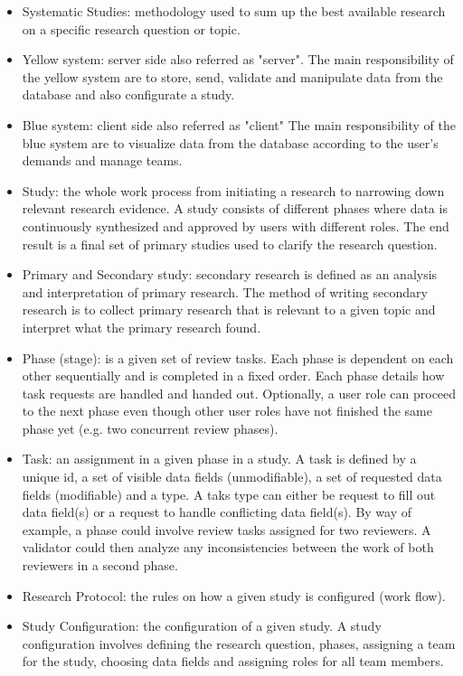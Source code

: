 	\begin{itemize}
	  \item Systematic Studies: methodology used to sum up the best available research on a specific research question or topic.  
	  \item Yellow system: server side also referred as "server". The main responsibility of the yellow system are to store, send, validate and manipulate data from the database and also configurate a study.
	  \item Blue system: client side also referred as "client" The main responsibility of the blue system are to visualize data from the database according to the user's demands and manage teams.
	  \item Study: the whole work process from initiating a research to narrowing down relevant research evidence. A study consists of different phases where data is continuously synthesized and approved by users with different roles. The end result is a final set of primary studies used to clarify the research question. 
	  \item Primary and Secondary study: secondary research is defined as an analysis and interpretation of primary research. The method of writing secondary research is to collect primary research that is relevant to a given topic and interpret what the primary research found.
	  \item Phase (stage): is a given set of review tasks. Each phase is dependent on each other sequentially and is completed in a fixed order. Each phase details how task requests are handled and handed out. Optionally, a user role can proceed to the next phase even though other user roles have not finished the same phase yet (e.g. two concurrent review phases).
	  \item Task: an assignment in a given phase in a study. A task is defined by a unique id, a set of visible data fields (unmodifiable), a set of requested data fields (modifiable) and a type. A taks type can either be  request to fill out data field(s) or a request to handle conflicting data field(s). By way of example, a phase could involve review tasks assigned for two reviewers. A validator could then analyze any inconsistencies between the work of both reviewers in a second phase.
	  \item Research Protocol: the rules on how a given study is configured (work flow).
	  \item Study Configuration: the configuration of a given study. A study configuration involves defining the research question, phases, assigning a team for the study, choosing data fields and assigning roles for all team members. 

\end{itemize}
